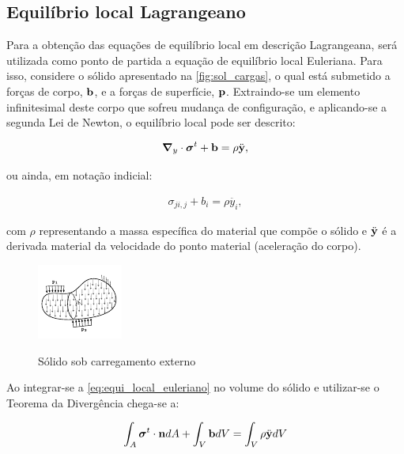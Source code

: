 \subsection{Equilíbrio local Lagrangeano}

Para a obtenção das equações de equilíbrio local em descrição Lagrangeana, será utilizada como ponto de partida a equação de equilíbrio local Euleriana. Para isso, considere o sólido apresentado na \autoref{fig:sol_cargas}, o qual está submetido a forças de corpo, $\mathbf{b}$, e a forças de superfície, $\mathbf{p}$. Extraindo-se um elemento infinitesimal deste corpo que sofreu mudança de configuração, e aplicando-se a segunda Lei de Newton, o  equilíbrio local pode ser descrito:

\begin{align}
	\boldsymbol{\nabla}_y \cdot \boldsymbol{\sigma}^{t} + \mathbf{b} = \rho  \ddot{\mathbf{y}}, \label{eq:equi_local_euleriano}
\end{align}

\noindent ou ainda, em notação indicial:

\begin{align}
	\sigma_{ji,j} + b_i  = \rho  \ddot{y_i},
\end{align}

\noindent com $\rho$ representando a massa específica do material que compõe o sólido e $\ddot{\mathbf{y}}$ é a derivada material da velocidade do ponto material (aceleração do corpo).

\begin{figure}[!htbp]
	\caption{Sólido sob carregamento externo}
	\centering
	\includegraphics[scale=4,trim=0cm 0.0cm 0cm 0cm, clip=true]{Imagens/Cap4/sol_cargas.pdf}	
	\label{fig:sol_cargas}
\end{figure}

Ao integrar-se a \autoref{eq:equi_local_euleriano} no volume do sólido e utilizar-se o Teorema da Divergência chega-se a:

\begin{align}
	\int_{A} {\boldsymbol{\sigma}}^{t} \cdot \mathbf{n} dA + \int_{V} \mathbf{b} dV = \int_{V} \rho  \ddot{\mathbf{y}} dV \label{eq:eq_global_euleriano}
\end{align}

